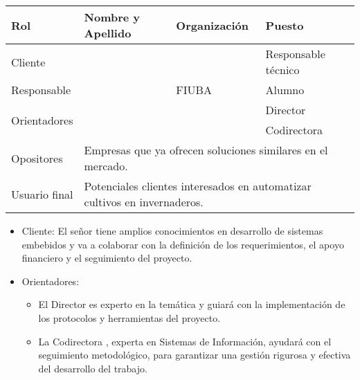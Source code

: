 \begin{table}[ht]
	\begin{tabularx}{\linewidth}{|p{2.15cm}|p{5.8cm}|p{2.1cm}|p{4.1cm}|}
		\hline
		\rowcolor[HTML]{C0C0C0}
		Rol                           & Nombre y Apellido                                                                              & Organización    & Puesto              \\ \hline
		Cliente                       & \clientename                                                                                   & \empclientename & Responsable técnico \\ \hline
		Responsable                   & \authorname                                                                                    & FIUBA           & Alumno              \\ \hline
		\multirow{2}{*}{Orientadores} & \supname                                                                                       & \pertesupname   & Director            \\
		                              & \cosupname                                                                                     & \pertecosupname & Codirectora         \\ \hline
		Opositores                    & \multicolumn{3}{l|}{Empresas que ya ofrecen soluciones similares en el mercado.}                                                       \\ \hline
		Usuario final                 & \multicolumn{3}{l|}{Potenciales clientes interesados en automatizar cultivos en invernaderos.}                                         \\ \hline
	\end{tabularx}
\end{table}

\begin{itemize}
	\item Cliente: El señor \clientename\hspace{1px} tiene amplios conocimientos en
	      desarrollo de sistemas embebidos y va a colaborar con la definición de los
	      requerimientos, el apoyo financiero y el seguimiento del proyecto.
	\item Orientadores:
	      \begin{itemize}
		      \item El Director \supname\hspace{1px} es experto en la temática y guiará con la
		            implementación de los protocolos y herramientas del proyecto.
		      \item La Codirectora \cosupname , experta en Sistemas de Información, ayudará con el
		            seguimiento metodológico, para garantizar una gestión rigurosa y efectiva del
		            desarrollo del trabajo.
	      \end{itemize}
\end{itemize}